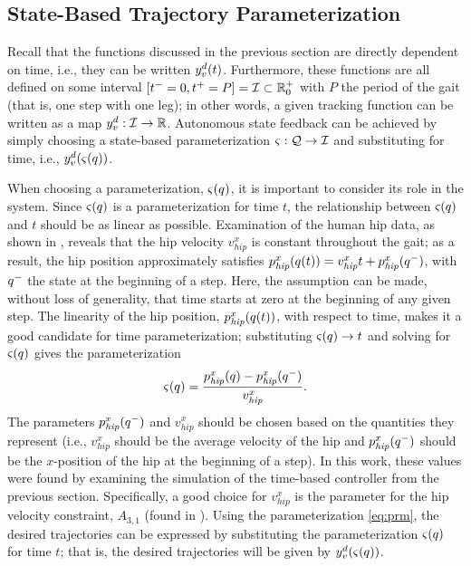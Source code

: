 \subsection{State-Based Trajectory Parameterization}

Recall that the functions discussed in the previous section are directly
dependent on time, i.e., they can be written $y_{v}^{d}(t)$.
%
Furthermore, these functions are all defined on some interval $[t^{-} = 0, t^{+}
= P] = \mathcal{I} \subset \mathbb{R}_{0}^{+}$ with $P$ the period of the gait (that is,
one step with one leg);
%
in other words, a given tracking function can be written as a map $y_{v}^{d} :
\mathcal{I} \to \mathbb{R}$.
%
Autonomous state feedback can be achieved by simply choosing a state-based
parameterization $\varsigma : \mathcal{Q} \to \mathcal{I}$ and substituting for time,
i.e., $y_{v}^{d}(\varsigma(q))$.

When choosing a parameterization, $\varsigma(q)$, it is important to consider
its role in the system.
%
Since $\varsigma(q)$ is a parameterization for time $t$, the relationship
between $\varsigma(q)$ and $t$ should be as linear as possible.
%
Examination of the human hip data, as shown in , reveals
that the hip velocity $v_{\mathit{hip}}^{x}$ is constant throughout the gait;
%
as a result, the hip position approximately satisfies
$p_{\mathit{hip}}^{x}(q(t)) = v_{\mathit{hip}}^x t + p_\mathit{hip}^x(q^{-})$,
with $q^{-}$ the state at the beginning of a step.
%
Here, the assumption can be made, without loss of generality, that time starts
at zero at the beginning of any given step.
%
The linearity of the hip position, $p_{\mathit{hip}}^{x}(q(t))$, with respect
to time, makes it a good candidate for time parameterization;
%
substituting $\varsigma(q) \to t$ and solving for $\varsigma(q)$ gives the
parameterization
\begin{align}
  \label{eq:prm}
  \varsigma(q) = \frac{p_{\mathit{hip}}^{x}(q) -
    p_{\mathit{hip}}^{x}(q^{-})}{v_{\mathit{hip}}^{x}}.
\end{align}
%
The parameters $p_{\mathit{hip}}^{x}(q^{-})$ and $v_{\mathit{hip}}^{x}$ should be
chosen based on the quantities they represent (i.e., $v_{\mathit{hip}}^{x}$
should be the average velocity of the hip and $p_{\mathit{hip}}^{x}(q^{-})$ should
be the $x$-position of the hip at the beginning of a step).
%
In this work, these values were found by examining the simulation of the
time-based controller from the previous section.
%
Specifically, a good choice for $v_{\mathit{hip}}^{x}$ is the parameter for the
hip velocity constraint, $A_{3,1}$ (found in ).
%
Using the parameterization \eqref{eq:prm}, the desired trajectories can be
expressed by substituting the parameterization $\varsigma(q)$ for time $t$;
%
that is, the desired trajectories will be given by
$y_{v}^{d}(\varsigma(q))$.

